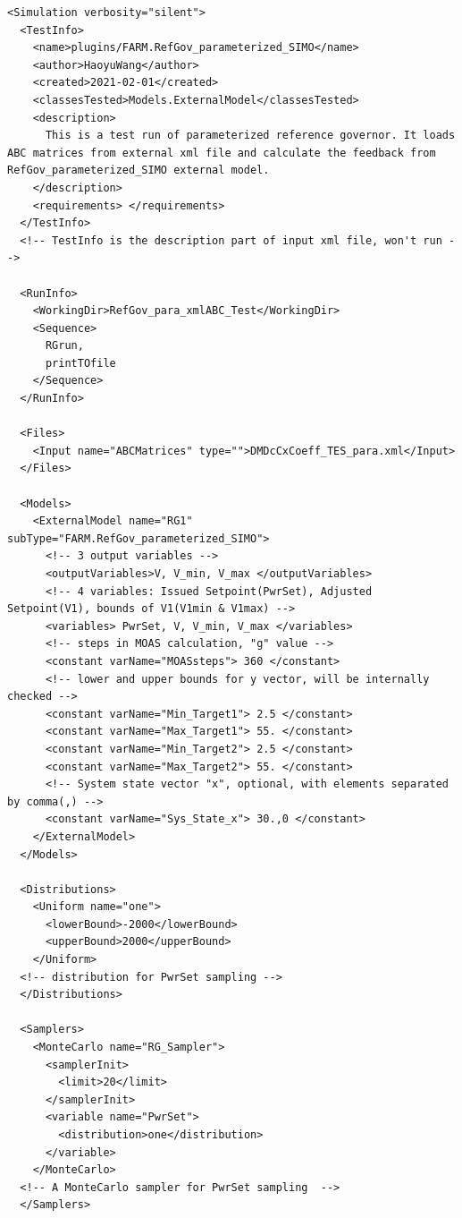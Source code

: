 \begin{lstlisting}[style=XML,morekeywords={anAttribute},
caption=Input File Example using RefGov.RefGov\_SIMO ExternalModel., label=lst:InputRGSIMOExample]
<Simulation verbosity="silent">
  <TestInfo>
    <name>plugins/FARM.RefGov_parameterized_SIMO</name>
    <author>HaoyuWang</author>
    <created>2021-02-01</created>
    <classesTested>Models.ExternalModel</classesTested>
    <description>
      This is a test run of parameterized reference governor. It loads ABC matrices from external xml file and calculate the feedback from RefGov_parameterized_SIMO external model.
    </description>
    <requirements> </requirements>
  </TestInfo>
  <!-- TestInfo is the description part of input xml file, won't run -->
  
  <RunInfo>
    <WorkingDir>RefGov_para_xmlABC_Test</WorkingDir>
    <Sequence>
      RGrun,
      printTOfile
    </Sequence>
  </RunInfo>
 
  <Files>
    <Input name="ABCMatrices" type="">DMDcCxCoeff_TES_para.xml</Input>
  </Files>

  <Models>
    <ExternalModel name="RG1" subType="FARM.RefGov_parameterized_SIMO">
      <!-- 3 output variables -->  
      <outputVariables>V, V_min, V_max </outputVariables>
      <!-- 4 variables: Issued Setpoint(PwrSet), Adjusted Setpoint(V1), bounds of V1(V1min & V1max) -->
      <variables> PwrSet, V, V_min, V_max </variables>
      <!-- steps in MOAS calculation, "g" value -->
      <constant varName="MOASsteps"> 360 </constant>
      <!-- lower and upper bounds for y vector, will be internally checked -->
      <constant varName="Min_Target1"> 2.5 </constant> 
      <constant varName="Max_Target1"> 55. </constant> 
      <constant varName="Min_Target2"> 2.5 </constant> 
      <constant varName="Max_Target2"> 55. </constant> 
      <!-- System state vector "x", optional, with elements separated by comma(,) -->
      <constant varName="Sys_State_x"> 30.,0 </constant>     
    </ExternalModel>
  </Models>
 
  <Distributions>
    <Uniform name="one">
      <lowerBound>-2000</lowerBound>
      <upperBound>2000</upperBound>
    </Uniform>
  <!-- distribution for PwrSet sampling -->
  </Distributions>

  <Samplers>
    <MonteCarlo name="RG_Sampler">
      <samplerInit>
        <limit>20</limit>
      </samplerInit>
      <variable name="PwrSet">
        <distribution>one</distribution>
      </variable>
    </MonteCarlo>
  <!-- A MonteCarlo sampler for PwrSet sampling  -->
  </Samplers>


\end{lstlisting}
